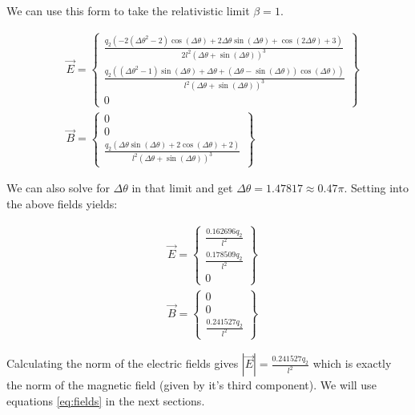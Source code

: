 \documentclass[11pt,a4paper]{article}
\begin{document}
We can use this form to take the relativistic limit $\beta=1$.

\begin{subequations}
\begin{align}
&\vec{E}=\left\{ \begin{array}{c}
\frac{q_2 \left(-2 \left(\Delta \theta ^2-2\right) \cos (\Delta \theta )+2 \Delta \theta  \sin (\Delta \theta )+\cos (2 \Delta \theta )+3\right)}{2 l^2 (\Delta \theta +\sin (\Delta \theta ))^3} \\
\frac{q_2 \left(\left(\Delta \theta ^2-1\right) \sin (\Delta \theta )+\Delta \theta +(\Delta \theta -\sin (\Delta \theta )) \cos (\Delta \theta )\right)}{l^2 (\Delta \theta +\sin (\Delta \theta ))^3} \\
0
\end{array}\right\}\\
&\vec{B}=\left\{ \begin{array}{c}
0\\
0\\
\frac{q_2 (\Delta \theta  \sin (\Delta \theta )+2 \cos (\Delta \theta )+2)}{l^2 (\Delta \theta +\sin (\Delta \theta ))^3} 
\end{array}\right\}
\end{align}
\end{subequations}

We can also solve for $\Delta \theta$ in that limit and get $\Delta \theta=1.47817\approx 0.47 \pi$. Setting into the above fields yields:

\begin{subequations}
\begin{align}
&\vec{E}=\left\{ \begin{array}{c}
\frac{0.162696 q_2}{l^2} \\
\frac{0.178509 q_2}{l^2} \\
0
\end{array}\right\}\\
&\vec{B}=\left\{ \begin{array}{c}
0\\
0\\
\frac{0.241527 q_2}{l^2}
\end{array}\right\}
\end{align}
\end{subequations}

Calculating the norm of the electric fields gives $|\vec{E}|=\frac{0.241527 q_2}{l^2}$ which is exactly the norm of the magnetic field (given by it's third component).
We will use equations \ref{eq:fields} in the next sections.
 
\end{document}
